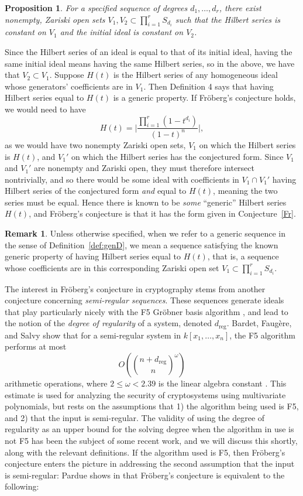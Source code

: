 \documentclass[11pt]{article}
\newcommand{\dreg}{d_{\text{reg}}}
\newtheorem{proposition}{Proposition}
\theoremstyle{definition}
\newtheorem{remark}{Remark}
\begin{document}
\begin{proposition}\label{prop:V1V2}
	For a specified sequence of degrees $d_1, \dots, d_r$, there exist nonempty, Zariski open sets $V_1, V_2 \subset \prod_{i = 1}^r S_{d_i}$ such that the Hilbert series is constant on $V_1$ and the initial ideal is constant on $V_2$. 
\end{proposition}


Since the Hilbert series of an ideal is equal to that of its initial ideal, having the same initial ideal means having the same Hilbert series, so in the above, we have that $V_2 \subset V_1$. Suppose $H(t)$ is the Hilbert series of any homogeneous ideal whose generators' coefficients are in $V_1$. Then Definition 4 says that having Hilbert series equal to $H(t)$ is a generic property. If Fröberg's conjecture holds, we would need to have \[ H(t) = \bigg| \frac{\prod_{i=1}^r (1 - t^{d_i})}{(1 - t)^n} \bigg|, \] as we would have two nonempty Zariski open sets, $V_1$ on which the Hilbert series is $H(t)$, and $V_1'$ on which the Hilbert series has the conjectured form. Since $V_1$ and $V_1'$ are nonempty and Zariski open, they must therefore intersect nontrivially, and so there would be some ideal with coefficients in $V_1 \cap V_1'$ having Hilbert series of the conjectured form \emph{and} equal to $H(t)$, meaning the two series must be equal. Hence there is known to be \emph{some} ``generic'' Hilbert series $H(t)$, and Fröberg's conjecture is that it has the form given in Conjecture~\ref{Fr}. 


\begin{remark}
	Unless otherwise specified, when we refer to a generic sequence in the sense of Definition~\ref{def:genD}, we mean a sequence satisfying the known generic property of having Hilbert series equal to $H(t)$, that is, a sequence whose coefficients are in this corresponding Zariski open set $V_1 \subset \prod_{i = 1}^r S_{d_i}$.
\end{remark}


The interest in Fröberg's conjecture in cryptography stems from another conjecture concerning \emph{semi-regular sequences}. These sequences generate ideals that play particularly nicely with the F5 Gröbner basis algorithm \cite{faugere2002new}, and lead to the notion of the \emph{degree of regularity} of a system, denoted $\dreg$. Bardet, Faugère, and Salvy show that for a semi-regular system in $k[x_1, \dots, x_n]$, the F5 algorithm performs at most \[ O\left( \binom{n + \dreg}{n}^\omega \right) \] arithmetic operations, where $2 \leq \omega < 2.39$ is the linear algebra constant \cite{bardet2004complexity}. This estimate is used for analyzing the security of cryptosystems using multivariate polynomials, but rests on the assumptions that 1) the algorithm being used is F5, and 2) that the input is semi-regular. The validity of using the degree of regularity as an upper bound for the solving degree when the algorithm in use is not F5 has been the subject of some recent work, and we will discuss this shortly, along with the relevant definitions. If the algorithm used is F5, then Fröberg's conjecture enters the picture in addressing the second assumption that the input is semi-regular: Pardue shows in \cite{pardue2010generic} that Fröberg's conjecture is equivalent to the following:
\end{document}
